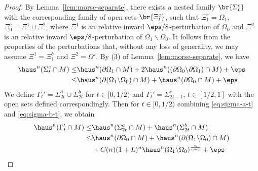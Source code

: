 \begin{lemma}
\begin{proof}
        By Lemma~\ref{lem:morse-separate}, there exists a nested family $\br{\Sigma_t^c}$ with the corresponding family of open sets $\br{\Xi_t^c}$, such that $\Xi_1^c = \Omega_1$, $\Xi_0^c = \Xi^1\sqcup \Xi^2$, where $\Xi^1$ is an relative inward $\eps/8$-perturbation of $\Omega_0$ and $\Xi^2$ is an relative inward $\eps/8$-perturbation of $\Omega_1\backslash\Omega_0$. It follows from the properties of the perturbations that, without any loss of generality, we may assume $\Xi^1 = \Xi_1^b$ and $\Xi^2 = \Omega'$. By (3) of Lemma~\ref{lem:morse-separate}, we have
        \begin{equation*}
        \begin{split}
            \haus^n(\Sigma_t^c\cap M) \leq& \haus^n(\partial\Omega_1\cap M) + 2\haus^n((\partial\Omega_0\backslash\partial\Omega_1)\cap M) + \eps\\
            \leq& \haus^n(\partial(\Omega_1\backslash\Omega_0)\cap M) + \haus^n(\partial\Omega_0\cap M) + \eps
        \end{split}
        \end{equation*}
        We define $\Gamma_t' = \Sigma_{2t}^a\cup\Sigma_{2t}^b$ for $t \in [0, 1/2)$ and $\Gamma_t' = \Sigma_{2t - 1}^c$, $t \in [1/2, 1]$ with the open sets defined correspondingly. Then for $t \in [0, 1/2)$ combining \ref{eq:sigma-a-t} and \ref{eq:sigma-b-t}, we obtain
        \begin{equation*}
            \begin{split}
                \haus^n(\Gamma_t'\cap M) \leq& 
                \haus^n(\Sigma_{2t}^a\cap M) + \haus^n(\Sigma_{2t}^b\cap M)\\
                \leq&  \haus^n(\partial\Omega_0\cap M) + \haus^n(\partial(\Omega_1\backslash\Omega_0)\cap M)\\
                &+ C(n)(1 + L)^n\haus^n(\Omega_1\backslash\Omega_0)^{\frac{n}{n + 1}} + \eps
            \end{split}
        \end{equation*}
    \end{proof}
\end{lemma}